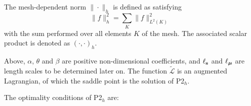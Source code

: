 
The mesh-dependent norm $\|\cdot\|_h$ is defined as satisfying
\begin{equation}
\|f\|_h^2 = \sum_K \|f\|^2_{L^2(K)} 
\end{equation}
with the sum performed over all elements $K$ of the mesh. The associated scalar product is denoted as $\left ( \cdot, \cdot \right )_h$.

Above, $\alpha$, $\theta$ and $\beta$ are positive non-dimensional coefficients, and $\ell_{\mathbf{s}}$ and $\ell_{\boldsymbol{\mu}}$ are length scales to be determined later on. The function $\tilde{\mathcal{L}}$ is an augmented Lagrangian, of which the saddle point is the solution of P2$_h$. 

The optimality conditions of P2$_h$ are:

